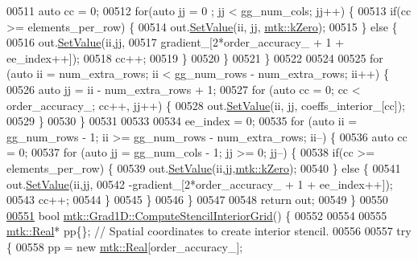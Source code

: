 \begin{DoxyCode}
{{00511     \textcolor{keyword}{auto} cc = 0;
00512     \textcolor{keywordflow}{for}(\textcolor{keyword}{auto} jj = 0 ; jj < gg\_num\_cols; jj++) \{
00513       \textcolor{keywordflow}{if}(cc >= elements\_per\_row) \{
00514         out.\hyperlink{classmtk_1_1DenseMatrix_a784ce5784109ac86bfb9d8562b334b13}{SetValue}(ii, jj, \hyperlink{group__c01-roots_ga59a451a5fae30d59649bcda274fea271}{mtk::kZero});
00515       \} \textcolor{keywordflow}{else} \{
00516         out.\hyperlink{classmtk_1_1DenseMatrix_a784ce5784109ac86bfb9d8562b334b13}{SetValue}(ii,jj,
00517                      gradient\_[2*order\_accuracy\_ + 1 + ee\_index++]);
00518         cc++;
00519       \}
00520     \}
00521   \}
00522 
00524 
00525   \textcolor{keywordflow}{for} (\textcolor{keyword}{auto} ii = num\_extra\_rows; ii < gg\_num\_rows - num\_extra\_rows; ii++) \{
00526     \textcolor{keyword}{auto} jj = ii - num\_extra\_rows + 1;
00527     \textcolor{keywordflow}{for} (\textcolor{keyword}{auto} cc = 0; cc < order\_accuracy\_; cc++, jj++) \{
00528       out.\hyperlink{classmtk_1_1DenseMatrix_a784ce5784109ac86bfb9d8562b334b13}{SetValue}(ii, jj, coeffs\_interior\_[cc]);
00529     \}
00530   \}
00531 
00533 
00534   ee\_index = 0;
00535   \textcolor{keywordflow}{for} (\textcolor{keyword}{auto} ii = gg\_num\_rows - 1; ii >= gg\_num\_rows - num\_extra\_rows; ii--) \{
00536     \textcolor{keyword}{auto} cc = 0;
00537     \textcolor{keywordflow}{for} (\textcolor{keyword}{auto} jj = gg\_num\_cols - 1; jj >= 0; jj--) \{
00538       \textcolor{keywordflow}{if}(cc >= elements\_per\_row) \{
00539         out.\hyperlink{classmtk_1_1DenseMatrix_a784ce5784109ac86bfb9d8562b334b13}{SetValue}(ii,jj,\hyperlink{group__c01-roots_ga59a451a5fae30d59649bcda274fea271}{mtk::kZero});
00540       \} \textcolor{keywordflow}{else} \{
00541         out.\hyperlink{classmtk_1_1DenseMatrix_a784ce5784109ac86bfb9d8562b334b13}{SetValue}(ii,jj,
00542                      -gradient\_[2*order\_accuracy\_ + 1 + ee\_index++]);
00543         cc++;
00544       \}
00545      \}
00546   \}
00547 
00548   \textcolor{keywordflow}{return} out;
00549 \}
00550 
\hypertarget{mtk__grad__1d_8cc_source_l00551}{}\hyperlink{classmtk_1_1Grad1D_ad6df25cc9dfc85ff8562ae3605486976}{00551} \textcolor{keywordtype}{bool} \hyperlink{classmtk_1_1Grad1D_ad6df25cc9dfc85ff8562ae3605486976}{mtk::Grad1D::ComputeStencilInteriorGrid}() \{
00552 
00554 
00555   \hyperlink{group__c01-roots_gac080bbbf5cbb5502c9f00405f894857d}{mtk::Real}* pp\{\}; \textcolor{comment}{// Spatial coordinates to create interior stencil.}
00556 
00557   \textcolor{keywordflow}{try} \{
00558     pp = \textcolor{keyword}{new} \hyperlink{group__c01-roots_gac080bbbf5cbb5502c9f00405f894857d}{mtk::Real}[order\_accuracy\_];
}}
\end{DoxyCode}
